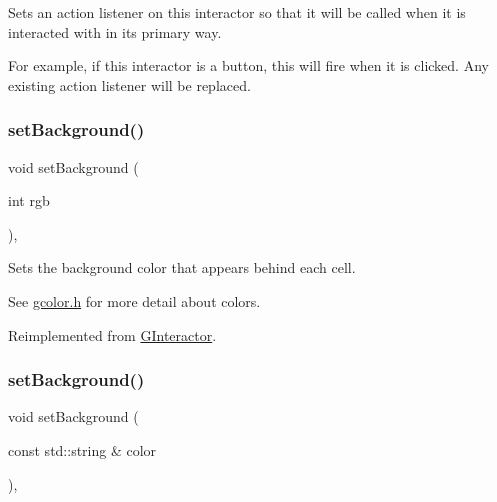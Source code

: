 Sets an action listener on this interactor so that it will be called when it is interacted with in its primary way. 

For example, if this interactor is a button, this will fire when it is clicked. Any existing action listener will be replaced. \mbox{\label{classGTable_aefbd30fa3e699d49b6dd2c2a2d6e8c2b}} 
\subsubsection{\texorpdfstring{set\+Background()}{setBackground()}\hspace{0.1cm}{\footnotesize\ttfamily [1/2]}}
{\footnotesize\ttfamily void set\+Background (\begin{DoxyParamCaption}\item[{int}]{rgb }\end{DoxyParamCaption})\hspace{0.3cm}{\ttfamily [override]}, {\ttfamily [virtual]}}



Sets the background color that appears behind each cell. 

See \mbox{\hyperlink{gcolor_8h_source}{gcolor.\+h}} for more detail about colors. 

Reimplemented from \mbox{\hyperlink{classGInteractor_acba7e546c2025c0a15ca4b4cc92043db}{G\+Interactor}}.

\mbox{\label{classGTable_a9cb99695b93494c7ba28268ce9e42c2a}} 
\subsubsection{\texorpdfstring{set\+Background()}{setBackground()}\hspace{0.1cm}{\footnotesize\ttfamily [2/2]}}
{\footnotesize\ttfamily void set\+Background (\begin{DoxyParamCaption}\item[{const std\+::string \&}]{color }\end{DoxyParamCaption})\hspace{0.3cm}{\ttfamily [override]}, {\ttfamily [virtual]}}




